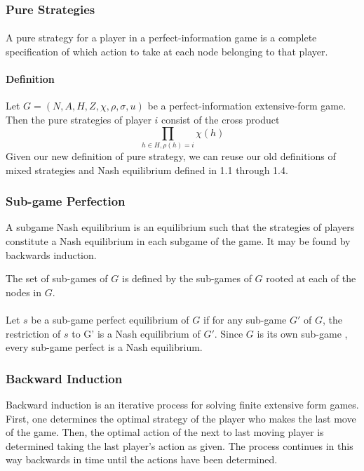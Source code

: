 \subsubsection{Pure Strategies}
\paragraph{} A pure strategy for a player in a perfect-information game is a complete specification of which action to take at each node belonging to that player.
\paragraph{Definition} Let $G = (N, A, H, Z,\chi ,\rho, \sigma, u ) $ be a perfect-information extensive-form game. Then the pure strategies of player $i$ consist of the cross product\\
\begin{equation}
\prod_{h \in H, \rho(h)=i}\chi(h)
\end{equation}
Given our new definition of pure strategy, we can reuse our old definitions of mixed strategies and Nash equilibrium defined in 1.1 through 1.4.
\subsubsection{Sub-game Perfection}
A subgame Nash equilibrium is an equilibrium such that the strategies of players constitute a Nash equilibrium in each subgame of the game. It may be found by backwards induction.
\begin{mydef}\label{def:def555}
The set of sub-games of $G$ is defined by the sub-games of $G$ rooted at each of the nodes in $G$.
\end{mydef}
\paragraph{}Let $s$ be a  sub-game perfect equilibrium of $G$ if for any sub-game $G'$ of $G$, the restriction of $s$ to G' is a Nash equilibrium of $G'$. Since $G$ is its own sub-game , every sub-game perfect is a Nash equilibrium.

\subsubsection{Backward Induction}
Backward induction is an iterative process for solving finite extensive form games. First, one determines the optimal strategy of the player who makes the last move of the game. Then, the optimal action of the next to last moving player is determined taking the last player's action as given. The process continues in this way backwards in time until the actions have been determined.

